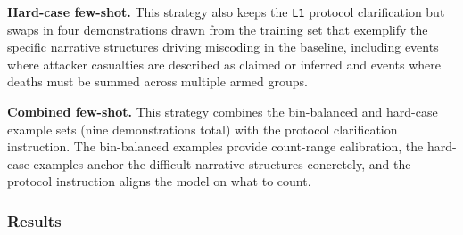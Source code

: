 \documentclass[
  11pt,
]{article}
\begin{document}
\textbf{Hard-case few-shot.} This strategy also keeps the \texttt{L1}
protocol clarification but swaps in four demonstrations drawn from the
training set that exemplify the specific narrative structures driving
miscoding in the baseline, including events where attacker casualties
are described as claimed or inferred and events where deaths must be
summed across multiple armed groups.

\textbf{Combined few-shot.} This strategy combines the bin-balanced and
hard-case example sets (nine demonstrations total) with the protocol
clarification instruction. The bin-balanced examples provide count-range
calibration, the hard-case examples anchor the difficult narrative
structures concretely, and the protocol instruction aligns the model on
what to count.

\subsubsection{Results}\label{results-1}

\begin{table}

\caption{\label{tbl-rarebin-llms}LLM prompt engineering results
(Llama-3.1-8B base).}


\end{table}%
\end{document}
